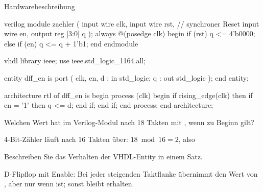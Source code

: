 \documentclass{uebungsblatt}
\begin{document}
\begin{aufgabe}{Hardwarebeschreibung}
\begin{codeblock}[zaehler.v]{verilog}
module zaehler (
    input  wire       clk,
    input  wire       rst,     // synchroner Reset
    input  wire       en,
    output reg  [3:0] q
);
    always @(posedge clk) begin
        if (rst)
            q <= 4'b0000;
        else if (en)
            q <= q + 1'b1;
    end
endmodule
\end{codeblock}

\begin{codeblock}{vhdl}
library ieee;
use ieee.std_logic_1164.all;

entity dff_en is
    port ( clk, en, d : in  std_logic;
           q          : out std_logic );
end entity;

architecture rtl of dff_en is
begin
    process (clk)
    begin
        if rising_edge(clk) then
            if en = '1' then
                q <= d;
            end if;
        end if;
    end process;
end architecture;
\end{codeblock}

\begin{teilaufgaben}
   Welchen Wert hat  im Verilog-Modul nach 18 Takten mit
           , wenn zu Beginn  gilt?
    \begin{loesung}
      4-Bit-Zähler läuft nach 16 Takten über: $18 \bmod 16 = 2$, also
       
    \end{loesung}
   Beschreiben Sie das Verhalten der VHDL-Entity in einem Satz.
    \begin{loesung}
      D-Flipflop mit Enable: Bei jeder steigenden Taktflanke übernimmt
       den Wert von , aber nur wenn
       ist; sonst bleibt  erhalten. 
    \end{loesung}
\end{teilaufgaben}
\end{aufgabe}
\end{document}
